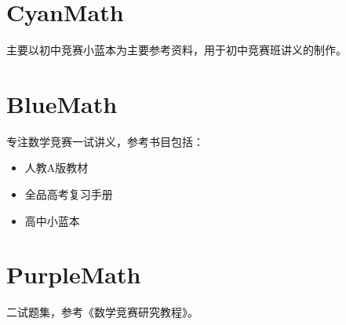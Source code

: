 \documentclass{ColorMath}
\begin{document}
\section{CyanMath}
主要以初中竞赛小蓝本为主要参考资料，用于初中竞赛班讲义的制作。

\section{BlueMath}
专注数学竞赛一试讲义，参考书目包括：
\begin{itemize}
    \item 人教A版教材
    \item 全品高考复习手册
    \item 高中小蓝本
\end{itemize}

\section{PurpleMath}
二试题集，参考《数学竞赛研究教程》。
\end{document}

